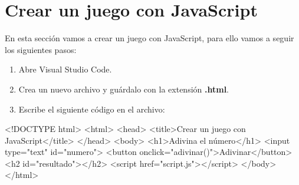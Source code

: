 \documentclass[
  a4paper,
  DIV=11,
  numbers=noendperiod,
  onepage,
  openany]{scrreprt}
\newenvironment{Shaded}{\begin{snugshade}}{\end{snugshade}}
\newcommand{\DataTypeTok}[1]{\textcolor[rgb]{0.68,0.00,0.00}{#1}}
\newcommand{\KeywordTok}[1]{\textcolor[rgb]{0.00,0.23,0.31}{#1}}
\newcommand{\NormalTok}[1]{\textcolor[rgb]{0.00,0.23,0.31}{#1}}
\newcommand{\OperatorTok}[1]{\textcolor[rgb]{0.37,0.37,0.37}{#1}}
\newcommand{\OtherTok}[1]{\textcolor[rgb]{0.00,0.23,0.31}{#1}}
\newcommand{\StringTok}[1]{\textcolor[rgb]{0.13,0.47,0.30}{#1}}
\begin{document}
\section{Crear un juego con
JavaScript}\label{crear-un-juego-con-javascript}

En esta sección vamos a crear un juego con JavaScript, para ello vamos a
seguir los siguientes pasos:

\begin{enumerate}
\def\labelenumi{\arabic{enumi}.}
\item
  Abre Visual Studio Code.
\item
  Crea un nuevo archivo y guárdalo con la extensión \textbf{.html}.
\item
  Escribe el siguiente código en el archivo:
\end{enumerate}

\begin{Shaded}
\begin{Highlighting}[]
\DataTypeTok{\textless{}!DOCTYPE }\NormalTok{html}\DataTypeTok{\textgreater{}}
\DataTypeTok{\textless{}}\KeywordTok{html}\DataTypeTok{\textgreater{}}
\DataTypeTok{\textless{}}\KeywordTok{head}\DataTypeTok{\textgreater{}}
    \DataTypeTok{\textless{}}\KeywordTok{title}\DataTypeTok{\textgreater{}}\NormalTok{Crear un juego con JavaScript}\DataTypeTok{\textless{}/}\KeywordTok{title}\DataTypeTok{\textgreater{}}
\DataTypeTok{\textless{}/}\KeywordTok{head}\DataTypeTok{\textgreater{}}
\DataTypeTok{\textless{}}\KeywordTok{body}\DataTypeTok{\textgreater{}}
    \DataTypeTok{\textless{}}\KeywordTok{h1}\DataTypeTok{\textgreater{}}\NormalTok{Adivina el número}\DataTypeTok{\textless{}/}\KeywordTok{h1}\DataTypeTok{\textgreater{}}
    \DataTypeTok{\textless{}}\KeywordTok{input}\OtherTok{ type}\OperatorTok{=}\StringTok{"text"}\OtherTok{ id}\OperatorTok{=}\StringTok{"numero"}\DataTypeTok{\textgreater{}}
    \DataTypeTok{\textless{}}\KeywordTok{button}\OtherTok{ onclick}\OperatorTok{=}\StringTok{"adivinar()"}\DataTypeTok{\textgreater{}}\NormalTok{Adivinar}\DataTypeTok{\textless{}/}\KeywordTok{button}\DataTypeTok{\textgreater{}}
    \DataTypeTok{\textless{}}\KeywordTok{h2}\OtherTok{ id}\OperatorTok{=}\StringTok{"resultado"}\DataTypeTok{\textgreater{}\textless{}/}\KeywordTok{h2}\DataTypeTok{\textgreater{}}
    \DataTypeTok{\textless{}}\KeywordTok{script}\OtherTok{ href}\OperatorTok{=}\StringTok{"script.js"}\DataTypeTok{\textgreater{}\textless{}/}\KeywordTok{script}\DataTypeTok{\textgreater{}}
\DataTypeTok{\textless{}/}\KeywordTok{body}\DataTypeTok{\textgreater{}}
\DataTypeTok{\textless{}/}\KeywordTok{html}\DataTypeTok{\textgreater{}}
\end{Highlighting}
\end{Shaded}
\end{document}
